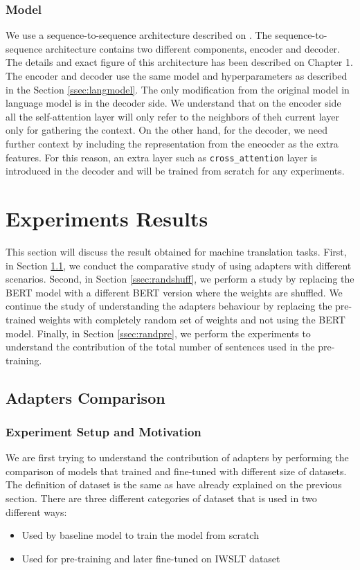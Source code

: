 \subsubsection{Model}
We use a sequence-to-sequence architecture described on \cite{vaswani2017attention}. The sequence-to-sequence architecture contains two different components, encoder and decoder. The details and exact figure of this architecture has been described on Chapter 1. The encoder and decoder use the same model and hyperparameters as described in the Section \ref{ssec:langmodel}. The only modification from the original model in language model is in the decoder side. We understand that on the encoder side all the self-attention layer will only refer to the neighbors of theh current layer only for gathering the context. On the other hand, for the decoder, we need further context by including the representation from the eneocder as the extra features. For this reason, an extra layer such as \texttt{cross\_attention} layer is introduced in the decoder and will be trained from scratch for any experiments.

\section{Experiments Results}
This section will discuss the result obtained for machine translation tasks. First, in Section \ref{ssec:adaptcomp}, we conduct the comparative study of using adapters with different scenarios. Second, in Section \ref{ssec:randshuff}, we perform a study by replacing the BERT model with a different BERT version where the weights are shuffled. We continue the study of understanding the adapters behaviour by replacing the pre-trained weights with completely random set of weights and not using the BERT model. Finally, in Section \ref{ssec:randpre}, we perform the experiments to understand the contribution of the total number of sentences used in the pre-training.

\subsection{Adapters Comparison}
\label{ssec:adaptcomp}
\subsubsection{Experiment Setup and Motivation}
We are first trying to understand the contribution of adapters by performing the comparison of models that trained and fine-tuned with different size of datasets. The definition of dataset is the same as have already explained on the previous section. There are three different categories of dataset that is used in two different ways:
\begin{itemize}
    \item Used by baseline model to train the model from scratch
    \item Used for pre-training and later fine-tuned on IWSLT dataset
\end{itemize}

